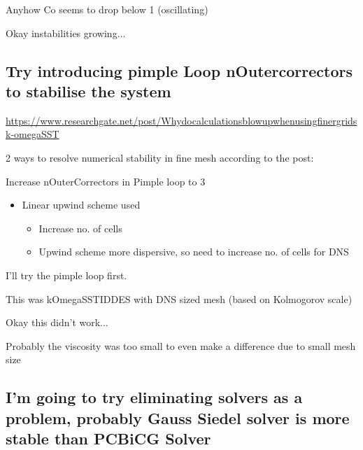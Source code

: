 \documentclass[12pt]{article}
\renewcommand{\_}{\kern-1.5pt\textunderscore\kern-1.5pt}
\begin{document}
\vspace{\baselineskip}
Anyhow Co seems to drop below 1 (oscillating)\par

Okay instabilities growing$ \ldots $ \par


\subsection{Try introducing pimple Loop nOutercorrectors to stabilise the system}

\href{https://www.researchgate.net/post/Why_do_calculations_blow_up_when_using_finer_grids_k-omega_SST}{https://www.researchgate.net/post/Why\_do\_calculations\_blow\_up\_when\_using\_finer\_grids\_k-omega\_SST}\par

2 ways to resolve numerical stability in fine mesh according to the post:\par

Increase nOuterCorrectors in Pimple loop to 3\par

\begin{itemize}
	\item Linear upwind scheme used\par
\begin{itemize}
	\item Increase no. of cells\par
	\item Upwind scheme more dispersive, so need to increase no. of cells for DNS

\end{itemize}

\end{itemize}

I’ll try the pimple loop first.\par

This was kOmegaSSTIDDES with DNS sized mesh (based on Kolmogorov scale)\par

Okay this didn’t work$ \ldots $ \par

Probably the viscosity was too small to even make a difference due to small mesh size\par

\subsection{I’m going to try eliminating solvers as a problem, probably Gauss Siedel solver is more stable than PCBiCG Solver}\par
\end{document}
